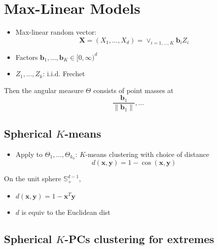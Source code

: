 \documentclass[
  13pt,
  letterpaper,
  DIV=11,
  numbers=noendperiod]{scrreprt}
\providecommand{\tightlist}{%
  \setlength{\itemsep}{0pt}\setlength{\parskip}{0pt}}\usepackage{longtable,booktabs,array}
\theoremstyle{plain}
\theoremstyle{definition}
\theoremstyle{definition}
\theoremstyle{plain}
\theoremstyle{definition}
\theoremstyle{plain}
\theoremstyle{remark}
\begin{document}
\section{Max-Linear Models}\label{max-linear-models}

\begin{itemize}
\item
  Max-linear random vector: \[
  \pmb{X} = (X_1, \ldots, X_d) = \vee_{i=1, \ldots, K}\pmb{b}_i Z_i
  \]
\item
  Factors \(\pmb{b}_1, \ldots, \pmb{b}_{K} \in [ 0, \infty )^{d}\)
\item
  \(Z_1, \ldots, Z_k\): i.i.d. Frechet
\end{itemize}

Then the angular measure \(\Theta\) consists of point masses at \[
\frac{\pmb{b}_1}{\|\pmb{b}_1\|}, \ldots
\]

\subsection{\texorpdfstring{Spherical
\(K\)-means}{Spherical K-means}}\label{spherical-k-means}

\begin{itemize}
\tightlist
\item
  Apply to \(\Theta_1, \ldots, \Theta_{k_n}\): \(K\)-means clustering
  with choice of distance \[
  d(\pmb{x}, \pmb{y}) = 1- \cos (\pmb{x}, \pmb{y})
  \]
\end{itemize}

On the unit sphere \(\mathbb{S}_{+}^{d-1}\),

\begin{itemize}
\tightlist
\item
  \(d(\pmb{x}, \pmb{y})= 1-\pmb{x}^T\pmb{y}\)
\item
  \(d\) is equiv to the Euclidean dist
\end{itemize}

\subsection{\texorpdfstring{Spherical \(K\)-PCs clustering for
extremes}{Spherical K-PCs clustering for extremes}}\label{spherical-k-pcs-clustering-for-extremes}
\end{document}
